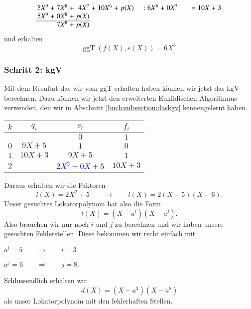 \[
\arraycolsep=1.4pt
\begin{array}{rcrcrcrcccrcrcrcrcrcrcrcrcr}
	5X^9&+& 7X^8&+& 4X^7&+& 10X^6&+& p(X)& & & & &:&6X^8&+&0X^7& & & & & & &=&10X&+&3\\
	5X^9&+& 0X^8&+& p(X)& & & & & &  & & & &   & & & & & &   & &  & & \\ \cline{1-5}
	&& 7X^8&+& p(X)& & & & & &   & & & & & &   & &  & & \\
\end{array}
\]
und erhalten
\[
\operatorname{ggT}(f(X),e(X)) = 6X^8.
\]

\subsubsection{Schritt 2: kgV}

Mit dem Resultat das wir vom ggT erhalten haben können wir jetzt das kgV berechnen. Dazu können wir jetzt den erweiterten Euklidischen Algorithmus verwenden, den wir in Abschnitt \ref{buch:subsection:daskgv} kennengelernt haben.
%
%
\begin{center}
	
	\begin{tabular}{| c | c | c c |}
		\hline
		$k$ &  $q_i$ & $e_i$ & $f_i$\\
		\hline 
		& & $0$& $1$\\
		$0$& $9X + 5$& $1$& $0$\\
		$1$& $10X + 3$& $9X+5$& $1$\\
		$2$& & \textcolor{blue}{$2X^2 + 0X + 5$}& $10X + 3$\\
		\hline
	\end{tabular}	
	
\end{center}
Daraus erhalten wir die Faktoren
\[
l(X) = 2X^2 + 5 \qquad \rightarrow \qquad l(X) = 2(X-5)(X-6).
\]
Unser gesuchtes Lokatorpolynom hat also die Form
\[
l(X) = (X-a^i)(X-a^j).
\]
Also brauchen wir nur noch $i$ und $j$ zu berechnen und wir haben unsere gesuchten Fehlerstellen.
Diese bekommen wir recht einfach mit
\begin{center}
	$a^i = 5 \qquad \Rightarrow \qquad i = 3$
	
	$a^j = 6 \qquad \Rightarrow \qquad j = 8$.
\end{center}
Schlussendlich erhalten wir
\[
d(X) = (X-a^3)(X-a^8)
\]
als unser Lokatorpolynom mit den fehlerhaften Stellen.
